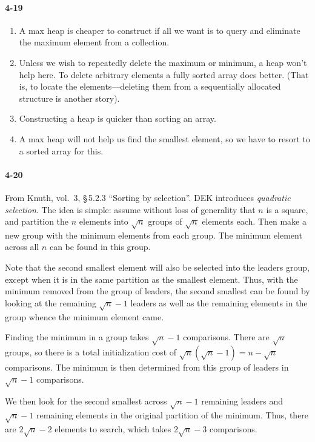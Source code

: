 \documentclass{report}
\begin{document}
\paragraph{4-19}
\begin{enumerate}[label=(\alph*)]
	\item A max heap is cheaper to construct if all we want is to query and eliminate the maximum element from a collection.
	\item Unless we wish to repeatedly delete the maximum or minimum, a heap won't help here. To delete arbitrary elements a fully sorted array does better. (That is, to locate the elements---deleting them from a sequentially allocated structure is another story).
	\item Constructing a heap is quicker than sorting an array.
	\item A max heap will not help us find the smallest element, so we have to resort to a sorted array for this.
\end{enumerate}

\paragraph{4-20} From Knuth, vol.\ 3, \S\,5.2.3 ``Sorting by selection''. DEK introduces \emph{quadratic selection}. The idea is simple: assume without loss of generality that $n$ is a square, and partition the $n$ elements into $\sqrt{n}$ groups of $\sqrt{n}$ elements each. Then make a new group with the minimum elements from each group. The minimum element across all $n$ can be found in this group.

Note that the second smallest element will also be selected into the leaders group, except when it is in the same partition as the smallest element. Thus, with the minimum removed from the group of leaders, the second smallest can be found by looking at the remaining $\sqrt{n}-1$ leaders as well as the remaining elements in the group whence the minimum element came.

\medskip

Finding the minimum in a group takes $\sqrt{n}-1$ comparisons. There are $\sqrt{n}$ groups, so there is a total initialization cost of $\sqrt{n}(\sqrt{n}-1) = n - \sqrt{n}$ comparisons. The minimum is then determined from this group of leaders in $\sqrt{n}-1$ comparisons.

We then look for the second smallest across $\sqrt{n}-1$ remaining leaders and $\sqrt{n}-1$ remaining elements in the original partition of the minimum. Thus, there are $2\sqrt{n}-2$ elements to search, which takes $2\sqrt{n}-3$ comparisons.
\end{document}
